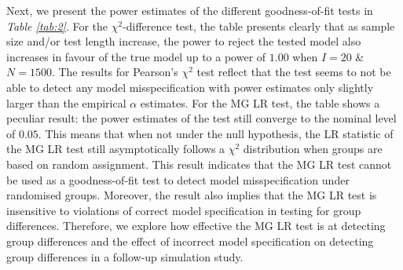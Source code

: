 \documentclass[Royal,sageapa,times,doublespace]{sagej}
\begin{document}
\indent Next, we present the power estimates of the different goodness-of-fit tests in \textit{Table \ref{tab:2}}. For the $\chi^2$-difference test, the table presents clearly that as sample size and/or test length increase, the power to reject the tested model also increases in favour of the true model up to a power of $1.00$ when $I = 20$ \& $N = 1500$. The results for Pearson's $\chi^2$ test reflect that the test seems to not be able to detect any model misspecification with power estimates only slightly larger than the empirical $\alpha$ estimates. For the MG LR test, the table shows a peculiar result: the power estimates of the test still converge to the nominal level of $0.05$. This means that when not under the null hypothesis, the LR statistic of the MG LR test still asymptotically follows a $\chi^2$ distribution when groups are based on random assignment. This result indicates that the MG LR test cannot be used as a goodness-of-fit test to detect model misspecification under randomised groups. Moreover, the result also implies that the MG LR test is insensitive to violations of correct model specification in testing for group differences. Therefore, we explore how effective the MG LR test is at detecting group differences and the effect of incorrect model specification on detecting group differences in a follow-up simulation study. \\
\end{document}
